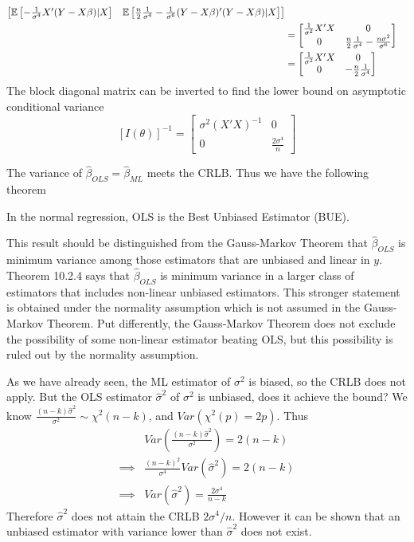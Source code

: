 \documentclass[DIV=14,titlepage=false]{scrreprt}
\begin{document}
\begin{example}
\begin{align*}
\begin{bmatrix}
            \mathbb{E}\left[-\frac{1}{\sigma^4}X'(Y-X\beta)|X\right] & \mathbb{E}\left[\frac{n}{2}\frac{1}{\sigma^4} -\frac{1}{\sigma^6}(Y-X\beta)'(Y-X\beta)|X\right]
        \end{bmatrix}\\
        &=\begin{bmatrix}
            \frac{1}{\sigma^2} X'X & 0\\
            0 & \frac{n}{2}\frac{1}{\sigma^4} -\frac{n \sigma^2}{\sigma^6}
        \end{bmatrix}\\
        &=\begin{bmatrix}
            \frac{1}{\sigma^2} X'X & 0\\
            0 & -\frac{n}{2}\frac{1}{\sigma^4} 
        \end{bmatrix}
    \end{align*}
The block diagonal matrix can be inverted to find the lower bound on asymptotic conditional variance 
\[
    [I(\theta)]^{-1} = \begin{bmatrix}
        \sigma^2 (X'X)^{-1} & 0\\
        0 & \frac{2 \sigma^4}{n} 
    \end{bmatrix}
\]
\end{example}
The variance of $\hat \beta_{OLS}= \hat \beta_{ML}$ meets the CRLB. Thus we have the following theorem
\begin{theorem}
    In the normal regression, OLS is the Best Unbiased Estimator (BUE).
\end{theorem}
This result should be distinguished from the Gauss-Markov Theorem that $\hat\beta_{OLS}$ is minimum variance among those estimators that are unbiased and linear in $y$. Theorem 10.2.4 says that $\hat\beta_{OLS}$ is minimum variance in a larger class of estimators that includes non-linear unbiased estimators. This stronger statement is obtained under the normality assumption which is not assumed in the Gauss-Markov Theorem. Put differently, the Gauss-Markov Theorem does not exclude the possibility of some non-linear estimator beating OLS, but this possibility is ruled out by the normality assumption.

As we have already seen, the ML estimator of $\sigma^2$ is biased, so the CRLB does not apply. But the OLS estimator $\hat\sigma^2$ of $\sigma^2$ is unbiased, does it achieve the bound? We know $\frac{(n-k)\hat\sigma^2}{\sigma^2} \sim \chi^2(n-k)$, and $Var(\chi^2(p)=2p)$. Thus
\begin{align*}
    & Var\left(\frac{(n-k)\hat\sigma^2}{\sigma^2}\right)= 2(n-k)\\
    \implies& \frac{(n-k)^2}{\sigma^4}Var(\hat\sigma^2) = 2(n-k)\\
    \implies& Var(\hat\sigma^2) = \frac{2\sigma^4}{n-k}
\end{align*}
Therefore $\hat\sigma^2$ does not attain the CRLB $2\sigma^4/n$. However it can be shown that an unbiased estimator with variance lower than $\hat\sigma^2$ does not exist.
\end{document}
